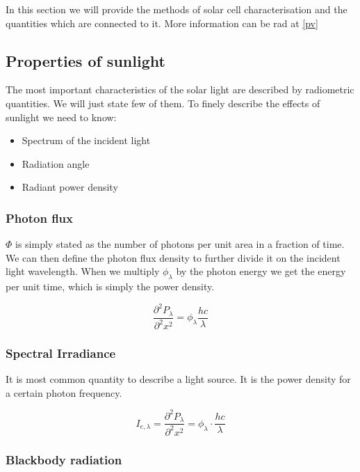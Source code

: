 In this section we will provide the methods of solar cell characterisation and the quantities which are connected to it. More information can be rad at \ref{pv}

\subsection{Properties of sunlight}

The most important characteristics of the solar light are described by radiometric quantities. We will just state few of them. To finely describe the effects of sunlight we need to know:

\begin{itemize}
\item Spectrum of the incident light
\item Radiation angle
\item Radiant power density
\end{itemize}

\subsubsection{Photon flux}
$\Phi$ is simply stated as the number of photons per unit area in a fraction of time. We can then define the photon flux density to further divide it on the incident light wavelength. When we multiply $\phi _{\lambda } $ by the photon energy we get the energy per unit time, which is simply the power density. 

\begin{equation}
\frac{\partial ^2 P_\lambda }{\partial ^2 x^2} = \phi _ {\lambda } \frac{hc}{\lambda }
\end{equation}

\subsubsection{Spectral Irradiance}

It is most common quantity to describe a light source. It is the power density for a certain photon frequency. 

\begin{equation}
I_{e,\lambda } = \frac{\partial ^2 P_\lambda }{\partial ^2 x^2} = \phi_\lambda \cdot \frac{hc}{\lambda }
\end{equation}

\subsubsection{Blackbody radiation}

